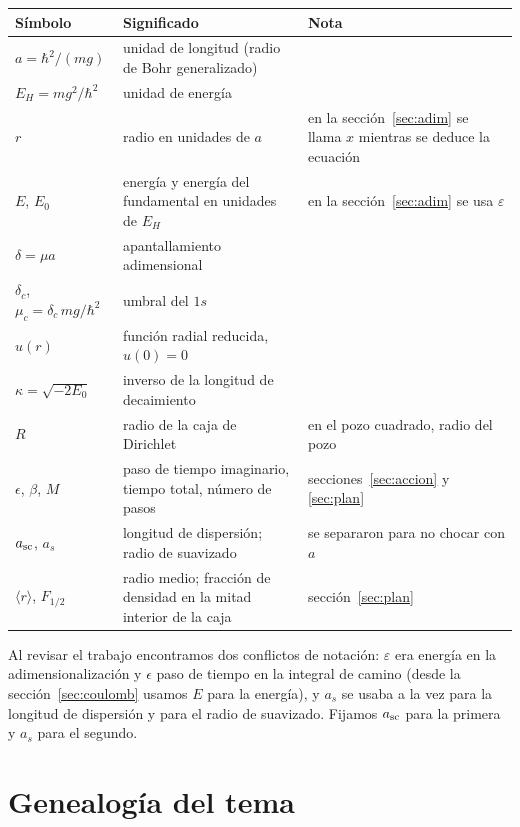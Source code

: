 \documentclass[11pt]{article}
\newcommand{\dc}{\delta_c}
\begin{document}
\begin{table}[H]
\centering
\small
\begin{tabular}{@{}lL{6.5cm}L{5.3cm}@{}}
\toprule
\textbf{Símbolo} & \textbf{Significado} & \textbf{Nota}\\
\midrule
$a=\hbar^2/(mg)$ & unidad de longitud (radio de Bohr generalizado) & \\
$E_H=mg^2/\hbar^2$ & unidad de energía & \\
$r$ & radio en unidades de $a$ & en la sección~\ref{sec:adim} se llama $x$ mientras se deduce la ecuación\\
$E$, $E_0$ & energía y energía del fundamental en unidades de $E_H$ & en la sección~\ref{sec:adim} se usa $\varepsilon$\\
$\delta=\mu a$ & apantallamiento adimensional & \\
$\dc$, $\mu_c=\dc\,mg/\hbar^2$ & umbral del $1s$ & \\
$u(r)$ & función radial reducida, $u(0)=0$ & \\
$\kappa=\sqrt{-2E_0}$ & inverso de la longitud de decaimiento & \\
$R$ & radio de la caja de Dirichlet & en el pozo cuadrado, radio del pozo\\
$\epsilon$, $\beta$, $M$ & paso de tiempo imaginario, tiempo total, número de pasos & secciones~\ref{sec:accion} y \ref{sec:plan}\\
$a_{\rm sc}$, $a_s$ & longitud de dispersión; radio de suavizado & se separaron para no chocar con $a$\\
$\langle r\rangle$, $F_{1/2}$ & radio medio; fracción de densidad en la mitad interior de la caja & sección~\ref{sec:plan}\\
\bottomrule
\end{tabular}
\end{table}

Al revisar el trabajo encontramos dos conflictos de notación: $\varepsilon$ era energía en la adimensionalización y $\epsilon$ paso de tiempo en la integral de camino (desde la sección~\ref{sec:coulomb} usamos $E$ para la energía), y $a_s$ se usaba a la vez para la longitud de dispersión y para el radio de suavizado. Fijamos $a_{\rm sc}$ para la primera y $a_s$ para el segundo.

\section{Genealogía del tema}
\label{sec:genealogia}
\end{document}
